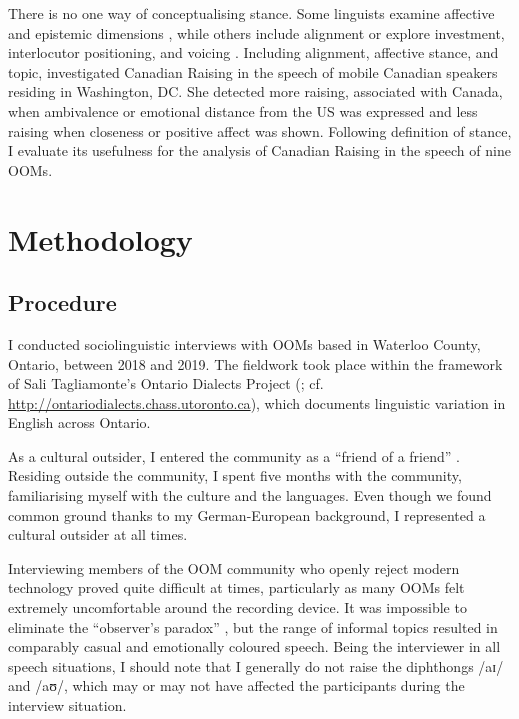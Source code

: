 \documentclass[output=paper]{langscibook}
\begin{document}
There is no one way of conceptualising stance. Some linguists examine affective and epistemic dimensions \citep{gadanidis_integrating_2021}, while others include alignment \citep{barnes_copula_2018} or explore investment, interlocutor positioning, and voicing \citep{bohmann_stance_2021}. Including alignment, affective stance, and topic, \citet{nycz_stylistic_2018} investigated Canadian Raising in the speech of mobile Canadian speakers residing in Washington, DC. She detected more raising, associated with Canada, when ambivalence or emotional distance from the US was expressed and less raising when closeness or positive affect was shown. Following  definition of stance, I evaluate its usefulness for the analysis of Canadian Raising in the speech of nine \glspl*{OOM}.

\section{Methodology}\label{neuhausen:sec:4}
\subsection{Procedure}\label{neuhausen:sec:4.1}

I conducted sociolinguistic interviews with \glspl*{OOM} based in Waterloo County, Ontario, between 2018 and 2019. The fieldwork took place within the framework of Sali Tagliamonte’s Ontario Dialects Project (\citeyear{tagliamonte_linguistic_2003,tagliamonte_directions_2007,tagliamonte_transmission_2010}; cf. \url{http://ontariodialects.chass.utoronto.ca}), which documents linguistic variation in English across Ontario.


As a cultural outsider, I entered the community as a “friend of a friend” \citep[53]{milroy_language_1980}. Residing outside the community, I spent five months with the community, familiarising myself with the culture and the languages. Even though we found common ground thanks to my German-European background, I represented a cultural outsider at all times.

Interviewing members of the \gls*{OOM} community who openly reject modern technology proved quite difficult at times, particularly as many \glspl*{OOM} felt extremely uncomfortable around the recording device. It was impossible to eliminate the “observer’s paradox” \citep[113]{labov_principles_1972}, but the range of informal topics resulted in comparably casual and emotionally coloured speech. Being the interviewer in all speech situations, I should note that I generally do not raise the diphthongs /aɪ/ and /aʊ/, which may or may not have affected the participants during the interview situation. 
\end{document}
